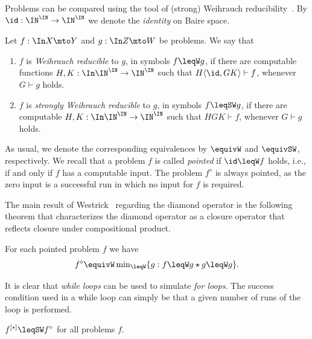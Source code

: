 Problems can be compared using the tool of (strong) Weihrauch reducibility~\cite{BGP21}.
By $\id:\IN^\IN\to\IN^\IN$ we denote the {\em identity} on Baire space.

\begin{defi}
Let $f:\In X\mto Y$ and $g:\In Z\mto W$ be problems. We say that
\begin{enumerate}
\item $f$ is {\em Weihrauch reducible} to $g$, in symbols $f\leqW g$, if there are computable functions
         ${H,K:\In\IN^\IN\to\IN^\IN}$ such that $H\langle\id,GK\rangle\vdash f$, whenever $G\vdash g$ holds. 
\item $f$ is {\em strongly Weihrauch reducible} to $g$, in symbols $f\leqSW g$, if there are computable
         $H,K:\In\IN^\IN\to\IN^\IN$ such that $HGK\vdash f$, whenever $G\vdash g$ holds. 
\end{enumerate}
\end{defi}

\noindent
As usual, we denote the corresponding equivalences by $\equivW$ and $\equivSW$, respectively. 
We recall that a problem $f$ is called {\em pointed} if $\id\leqW f$ holds, i.e., if and only if $f$ has a computable input.
The problem $f^\diamond$ is always pointed, as the zero input is a successful run in which no input for $f$ is required.

The main result of Westrick~\cite{Wes21} regarding the diamond operator is the following theorem
that characterizes the diamond operator as a closure operator that reflects closure under
compositional product.

\begin{thm}[Westrick 2021]
\label{them:Westrick}
For each pointed problem $f$ we have
\[f^\diamond\equivW\min\nolimits_{\leqW}\{g:f\leqW g\star g\leqW g\}.\]
\end{thm}

\noindent
It is clear that {\em while loops} can be used to simulate {\em for loops}. 
The success condition used in a while loop can simply be that a given number
of runs of the loop is performed.

\begin{prop}
\label{prop:for-while}
$f^{[*]}\leqSW f^\diamond$ for all problems $f$.
\end{prop}

